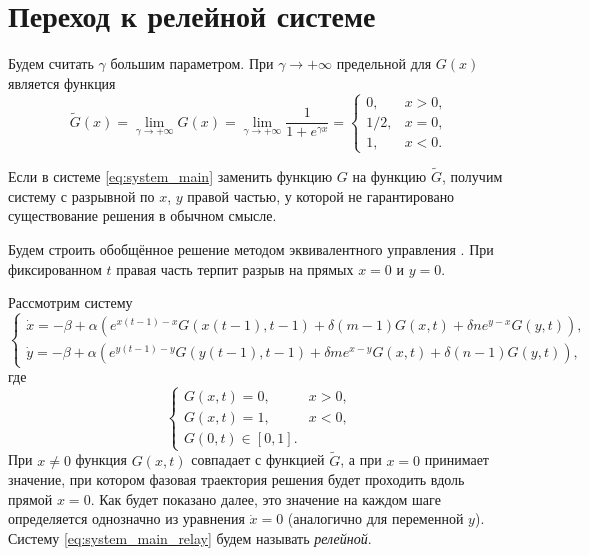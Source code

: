 \section{Переход к релейной системе}\label{sec:ch3/sect3}

Будем считать $\gamma$ большим параметром. При $\gamma \to +\infty$ предельной для $G(x)$ является функция 
%
\begin{equation}
	\label{eq:relay_G_tilde}
	\tilde{G}(x) = \lim\limits_{\gamma \to +\infty}G(x) = \lim\limits_{\gamma \to +\infty} \dfrac{1}{1 + e^{\gamma x}} = 
	\begin{cases}
		0, & x > 0,\\
		1/2, & x = 0,\\
		1, & x < 0.
	\end{cases}
\end{equation}

Если в системе \eqref{eq:system_main} заменить функцию $G$ на функцию $\tilde{G}$, получим систему с разрывной по $x$, $y$ правой частью, у которой не гарантировано существование решения в обычном смысле.

Будем строить обобщённое решение методом эквивалентного управления \cite[\S 4, с. 54]{Filippov1988}. При фиксированном $t$ правая часть терпит разрыв на прямых $x = 0$ и $y = 0$. 

Рассмотрим систему
%
\begin{equation}
	\label{eq:system_main_relay}
	\begin{cases}
		\dot{x} = -\beta + \alpha \left(e^{x(t - 1) - x} G(x(t - 1), t - 1) + \delta (m - 1) G(x, t) + \delta n e^{y - x} G(y, t)\right),\\
		\dot{y} = -\beta + \alpha \left(e^{y(t - 1) - y} G(y(t - 1), t - 1) + \delta m e^{x - y} G(x, t) + \delta (n - 1) G(y, t)\right),
	\end{cases}
\end{equation}
%
где 
\begin{equation}
	\label{eq:relay_G}
	\begin{cases}
		G(x, t) = 0, & x > 0,\\
		G(x, t) = 1, & x < 0,\\
		G(0, t) \in [0, 1].
	\end{cases}
\end{equation}
%
При $x \neq 0$ функция $G(x, t)$ совпадает с функцией $\tilde{G}$, а при $x = 0$ принимает значение, при котором фазовая траектория решения будет проходить вдоль прямой $x = 0$. Как будет показано далее, это значение на каждом шаге определяется однозначно из уравнения $\dot{x} = 0$ (аналогично для переменной $y$).
%
Систему \eqref{eq:system_main_relay} будем называть \emph{релейной}.

